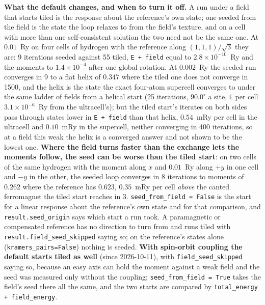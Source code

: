 \documentclass[11pt,a4paper]{article}
\newcommand{\code}[1]{\texttt{\small #1}}
\begin{document}
\textbf{What the default changes, and when to turn it off.} A run under a field
that starts tiled is the response about the reference's own state; one seeded
from the field is the state the loop relaxes to from the field's texture, and
on a cell with more than one self-consistent solution the two need not be the
same one. At $0.01$~Ry on four cells of hydrogen with the reference along
$(1,1,1)/\sqrt3$ they are: 9 iterations seeded against 55 tiled, \code{E +
field} equal to $2.8\times10^{-10}$~Ry and the moments to $1.4\times10^{-4}$
after one global rotation. At $0.002$~Ry the seeded run converges in 9 to a flat
helix of $0.347$ where the tiled one does not converge in 1500, and the helix is
the state the exact four-atom supercell converges to under the same ladder of
fields from a helical start (25 iterations, $90.0^\circ$ a site, \code{E} per
cell $3.1\times10^{-6}$~Ry from the ultracell's); but the tiled start's iterates
on both sides pass through states lower in \code{E + field} than that helix,
$0.54$~mRy per cell in the ultracell and $0.10$~mRy in the supercell, neither
converging in 400 iterations, so at a field this weak the helix is a converged
answer and not shown to be the lowest one. \textbf{Where the field turns faster
than the exchange lets the moments follow, the seed can be worse than the tiled
start}: on two cells of the same hydrogen with the moment along $x$ and $0.01$~Ry
along $+y$ in one cell and $-y$ in the other, the seeded loop converges in 8
iterations to moments of $0.262$ where the reference has $0.623$, $0.35$~mRy per
cell \emph{above} the canted ferromagnet the tiled start reaches in 3. \code{seed\_from\_field = False} is
the start for a linear response about the reference's own state and for that
comparison, and \code{result.seed\_origin} says which start a run took. A
paramagnetic or compensated reference has no direction to turn from and runs
tiled with \code{result.field\_seed\_skipped} saying so; on the reference's
states alone (\code{kramers\_pairs=False}) nothing is seeded. \textbf{With
spin-orbit coupling the default starts tiled as well} (since 2026-10-11), with
\code{field\_seed\_skipped} saying so, because an easy axis can hold the moment
against a weak field and the seed was measured only without the coupling;
\code{seed\_from\_field = True} takes the field's seed there all the same, and
the two starts are compared by \code{total\_energy + field\_energy}.
\end{document}
